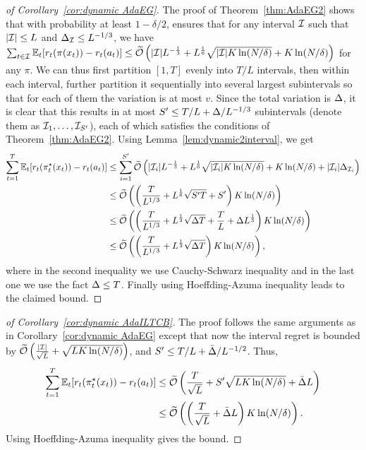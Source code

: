 \begin{proof}[of Corollary~\ref{cor:dynamic AdaEG}]
The proof of Theorem~\ref{thm:AdaEG2} shows that with probability at
least $1 - \delta/2$, \AdaEG ensures that for any interval ${\mathcal{I}}$
such that $|{\mathcal{I}}| \leq L$ and $\Delta_{\mathcal{I}} \leq L^{-1/3}$, we have
$\sum_{t \in {\mathcal{I}}} \mathbb{E}_t[ r_t(\pi(x_t)) - r_t(a_t)] \leq
\widetilde{\mathcal{O}}\left(|{\mathcal{I}}|L^{-\frac{1}{3}} + L^\frac{1}{6}\sqrt{\lvert{\mathcal{I}}\rvert K\ln(N/\delta)} +
K\ln(N/\delta)\right)$ for any $\pi$.  We can thus first partition $[1, T]$ evenly
into $T/L$ intervals, then within each interval, further partition it sequentially
into several largest subintervals so that for each of them the variation is at
most $v$. Since the total variation is $\Delta$, it is clear that
this results in at most $S'\leq T/L + \Delta/L^{-1/3}$ subintervals (denote them as ${\mathcal{I}}_1, \ldots, {\mathcal{I}}_{S'}$), each of
which satisfies the conditions of Theorem~\ref{thm:AdaEG2}. Using Lemma~\ref{lem:dynamic2interval}, we get 
\begin{align*}
\sum_{t=1}^T \mathbb{E}_t[ r_t(\pi_t^\star(x_t)) - r_t(a_t)] 
&\leq \sum_{i=1}^{S'} \widetilde{\mathcal{O}}\left(|{\mathcal{I}}_i|L^{-\frac{1}{3}} + L^\frac{1}{6}\sqrt{|{\mathcal{I}}_i|K\ln(N/\delta)} + K\ln(N/\delta) + |{\mathcal{I}}_i|\Delta_{{\mathcal{I}}_i}\right) \\
&\leq \widetilde{\mathcal{O}}\left(\left(\frac{T}{L^{1/3}} + L^{\frac{1}{6}}\sqrt{S'T}+S' \right)K\ln(N/\delta)\right) \\
&\leq \widetilde{\mathcal{O}}\left(\left(\frac{T}{L^{1/3}} + L^{\frac{1}{3}}\sqrt{\Delta T} + \frac{T}{L} + \Delta L^\frac{1}{3} \right)K\ln(N/\delta) \right) \\
&\leq \widetilde{\mathcal{O}}\left(\left(\frac{T}{L^{1/3}} + L^{\frac{1}{3}}\sqrt{\Delta T} \right)K\ln(N/\delta) \right), 
\end{align*}
where in the second inequality we use Cauchy-Schwarz inequality and in the last one we use the fact $\Delta \leq T$. Finally using Hoeffding-Azuma inequality leads to the claimed bound. 
\end{proof}

\begin{proof}[of Corollary~\ref{cor:dynamic AdaILTCB}]
The proof follows the same arguments as in Corollary~\ref{cor:dynamic AdaEG} except that now the interval regret is bounded by $\widetilde{\mathcal{O}}\left(\frac{|{\mathcal{I}}|}{\sqrt{L}} + \sqrt{LK\ln(N/\delta)} \right)$, and $S^\prime\leq T/L + \bar{\Delta}/L^{-1/2}$. Thus, 
\begin{align*}
\sum_{t=1}^T \mathbb{E}_t[ r_t(\pi_t^\star(x_t)) - r_t(a_t)] 
&\leq \widetilde{\mathcal{O}}\left(\frac{T}{\sqrt{L}} + S' \sqrt{LK\ln(N/\delta)} + \bar{\Delta} L\right) \\
&\leq \widetilde{\mathcal{O}}\left( \left(\frac{T}{\sqrt{L}} + \bar{\Delta} L\right)K\ln(N/\delta) \right). 
\end{align*}
Using Hoeffding-Azuma inequality gives the bound.
\end{proof}

